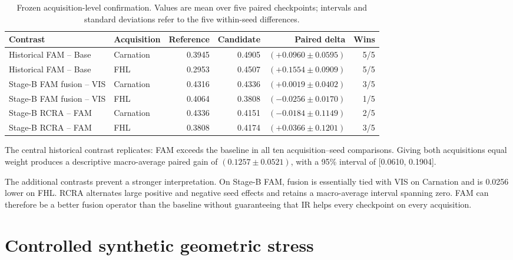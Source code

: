 \begin{table}[htbp]
  \centering
  \caption{Frozen acquisition-level confirmation. Values are mean \mapfifty{}
  over five paired checkpoints; intervals and standard deviations refer to the
  five within-seed differences.}
  \label{tab:unused-acquisition-confirmation}
  \begin{adjustbox}{max width=\textwidth}
  \begin{tabular}{llrrrr}
    \toprule
    Contrast & Acquisition & Reference & Candidate & Paired delta & Wins \\
    \midrule
    Historical FAM -- Base & Carnation & 0.3945 & 0.4905 & $(+0.0960\pm0.0595)$ & 5/5 \\
    Historical FAM -- Base & FHL & 0.2953 & 0.4507 & $(+0.1554\pm0.0909)$ & 5/5 \\
    Stage-B FAM fusion -- VIS & Carnation & 0.4316 & 0.4336 & $(+0.0019\pm0.0402)$ & 3/5 \\
    Stage-B FAM fusion -- VIS & FHL & 0.4064 & 0.3808 & $(-0.0256\pm0.0170)$ & 1/5 \\
    Stage-B RCRA -- FAM & Carnation & 0.4336 & 0.4151 & $(-0.0184\pm0.1149)$ & 2/5 \\
    Stage-B RCRA -- FAM & FHL & 0.3808 & 0.4174 & $(+0.0366\pm0.1201)$ & 3/5 \\
    \bottomrule
  \end{tabular}
  \end{adjustbox}
\end{table}

The central historical contrast replicates: FAM exceeds the baseline in all ten
acquisition--seed comparisons. Giving both acquisitions equal weight produces
a descriptive macro-average paired gain of $(0.1257\pm0.0521)$, with a 95\%
interval of [0.0610, 0.1904].

The additional contrasts prevent a stronger interpretation. On Stage-B FAM,
fusion is essentially tied with VIS on Carnation and is 0.0256 lower on FHL.
RCRA alternates large positive and negative seed effects and retains a
macro-average interval spanning zero. FAM can therefore be a better fusion
operator than the baseline without guaranteeing that IR helps every checkpoint
on every acquisition.

\section{Controlled synthetic geometric stress}
\label{sec:synthetic-geometric-stress}

